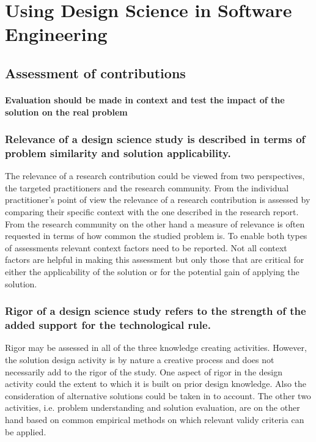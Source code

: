 \documentclass[graybox]{svmult}
\begin{document}
\section{Using Design Science in Software Engineering}
\subsection{Assessment of contributions}
\paragraph{Evaluation should be made in context and test the impact of the solution on the real problem}

\subsubsection{Relevance of a design science study is described in terms of problem similarity and solution applicability.} The relevance of a research contribution could be viewed from two perspectives, the targeted practitioners and the research community. From the individual practitioner's point of view the relevance of a research contribution is assessed by comparing their specific context with the one described in the research report. From the research community on the other hand a measure of relevance is often requested in terms of how common the studied problem is. To enable both types of assessments relevant context factors need to be reported. Not all context factors are helpful in making this assessment but only those that are critical for either the applicability of the solution or for the potential gain of applying the solution. 


\subsubsection{Rigor of a design science study refers to the strength of the added support for the technological rule.} Rigor may be assessed in all of the three knowledge creating activities. However, the solution design activity is by nature a creative process and does not necessarily add to the rigor of the study. One aspect of rigor in the design activity could the extent to which it is built on prior design knowledge. Also the consideration of alternative solutions could be taken in to account. The other two activities, i.e. problem understanding and solution evaluation, are on the other hand based on common empirical methods on which relevant validy criteria can be applied. 
\end{document}
